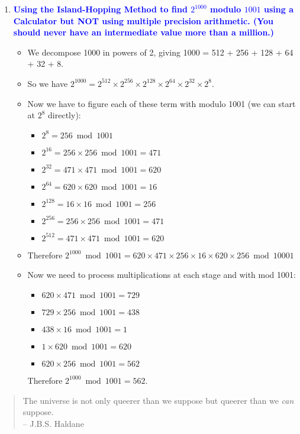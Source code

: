 \documentclass[11pt]{article}
\begin{document}
\begin{enumerate}
\item \textbf{\textcolor{blue}{Using the Island-Hopping Method to find $2^{1000}$ modulo $1001$ using a Calculator but NOT using multiple precision arithmetic. (You should never have an intermediate value more than a million.)}}
    \begin{itemize}
        \item We decompose 1000 in powers of 2, giving 1000 = 512 + 256 + 128 + 64 + 32 + 8.
        \item So we have $2^{1000} = 2^{512} \times 2^{256} \times 2^{128} \times 2^{64} \times 2^{32} \times 2^8$.
        \item Now we have to figure each of these term with modulo 1001 (we can start at $2^8$ directly):
        \begin{itemize}[label={***}]
            \item $2^{8} = 256 \bmod{1001}$
            \item $2^{16} = 256 \times 256 \bmod{1001} = 471$
            \item $2^{32} = 471 \times 471 \bmod{1001} = 620$
            \item $2^{64} = 620 \times 620 \bmod{1001} = 16$
            \item $2^{128} = 16 \times 16 \bmod{1001} = 256$
            \item $2^{256} = 256 \times 256 \bmod{1001} = 471$
            \item $2^{512} = 471 \times 471 \bmod{1001} = 620$
        \end{itemize}
        \item Therefore $2^{1000} \bmod{1001} = 620 \times 471 \times 256 \times 16 \times 620 \times 256 \bmod{10001}$
        \item Now we need to process multiplications at each stage and with mod 1001:
        \begin{itemize}[label={***}]
            \item $620 \times 471 \bmod{1001} = 729$
            \item $729 \times 256 \bmod{1001} = 438$
            \item $438 \times 16 \bmod{1001} = 1$
            \item $1 \times 620 \bmod{1001} = 620$
            \item $620 \times 256 \bmod{1001} = 562$          
        \end{itemize}
        Therefore $2^{1000} \bmod{1001} = 562$.
    \end{itemize}

\end{enumerate}

\begin{quote}
The universe is not only queerer than we suppose but queerer than we {\em can}
suppose.  \\ -- J.B.S. Haldane
\end{quote}
\end{document}

